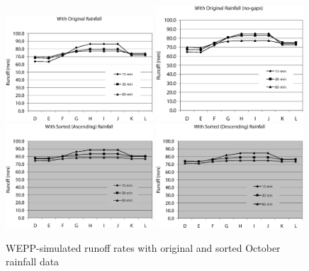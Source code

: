 \begin{figure}[htbp]
  \centering
    \includegraphics[width=0.49\textwidth]{./img/wepp_runoff_with_original}
    \includegraphics[width=0.49\textwidth]
{./img/wepp_runoff_with_original_nogap}\\[5mm]
    \includegraphics[width=0.49\textwidth]{./img/wepp_runoff_with_sorted_asc}
    \includegraphics[width=0.49\textwidth]{./img/wepp_runoff_with_sorted_des}
  \caption{WEPP-simulated runoff rates with original and sorted October rainfall
data}
  \label{fig:wepp_runoff_results}
\end{figure}

